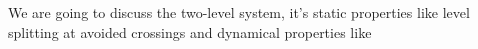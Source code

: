 We are going to discuss the two-level system, it's static properties like level splitting at avoided crossings and dynamical properties like 